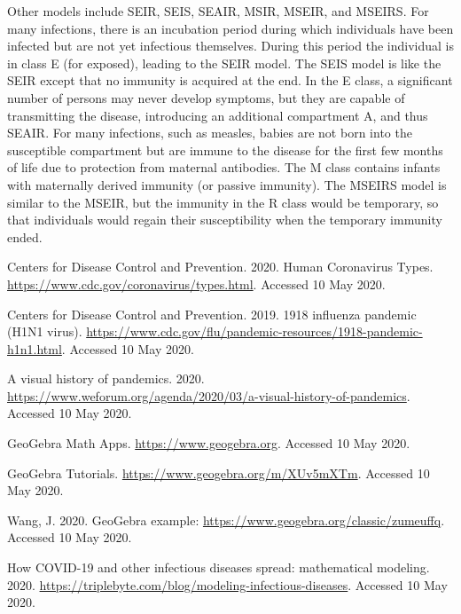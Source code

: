 \documentclass[10pt,letterpaper]{article}
\begin{document}
\bigskip
Other models include SEIR, SEIS, SEAIR, MSIR, MSEIR, and MSEIRS. For many infections, there is an incubation period during which individuals have been infected but are not yet infectious themselves. During this period the individual is in class E (for exposed), leading to the SEIR model. The SEIS model is like the SEIR except that no immunity is acquired at the end. In the E class, a significant number of persons may never develop symptoms, but they are capable of transmitting the disease, introducing an additional compartment A, and thus SEAIR. For many infections, such as measles, babies are not born into the susceptible compartment but are immune to the disease for the first few months of life due to protection from maternal antibodies. The M class contains infants with maternally derived immunity (or passive immunity). The MSEIRS model is similar to the MSEIR, but the immunity in the R class would be temporary, so that individuals would regain their susceptibility when the temporary immunity ended. 

\begin{thebibliography}{98}

 Centers for Disease Control and Prevention. 2020. Human Coronavirus Types. \href{https://www.cdc.gov/coronavirus/types.html}{https://www.cdc.gov/coronavirus/types.html}. Accessed 10 May 2020.

 Centers for Disease Control and Prevention. 2019. 1918 influenza pandemic (H1N1 virus). 
\href{https://www.cdc.gov/flu/pandemic-resources/1918-pandemic-h1n1.html}{https://www.cdc.gov/flu/pandemic-resources/1918-pandemic-h1n1.html}. Accessed 10 May 2020.

 A visual history of pandemics. 2020. 
\href{https://www.weforum.org/agenda/2020/03/a-visual-history-of-pandemics}{https://www.weforum.org/agenda/2020/03/a-visual-history-of-pandemics}. Accessed 10 May 2020.

 GeoGebra Math Apps. \href{https://www.geogebra.org}{https://www.geogebra.org}. Accessed 10 May 2020.

 GeoGebra Tutorials. \href{https://www.geogebra.org/m/XUv5mXTm}{https://www.geogebra.org/m/XUv5mXTm}. Accessed 10 May 2020.

 Wang, J. 2020. GeoGebra example: \href{https://www.geogebra.org/classic/zumeuffq}{https://www.geogebra.org/classic/zumeuffq}. Accessed 10 May 2020.

 How COVID-19 and other infectious diseases spread: mathematical modeling. 2020. 
\href{https://triplebyte.com/blog/modeling-infectious-diseases}{https://triplebyte.com/blog/modeling-infectious-diseases}. Accessed 10 May 2020.

\end{thebibliography}
\end{document}
